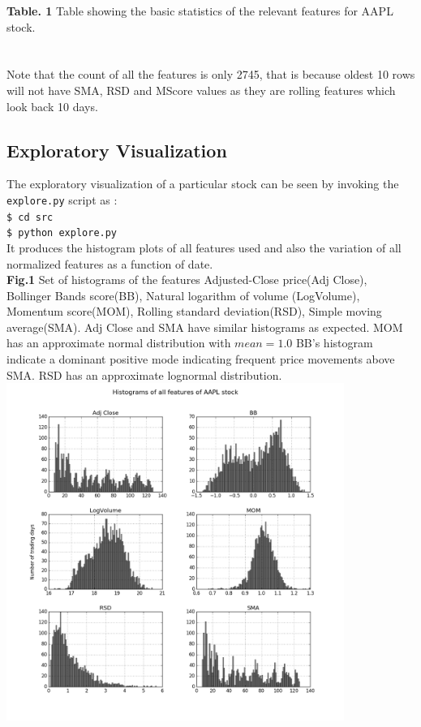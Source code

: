\documentclass[10pt]{report}
\begin{document}
\textbf{Table. 1} Table showing the basic statistics of the relevant features for AAPL stock.\\
\\
\\
Note that the count of all the features is only 2745, that is because oldest 10 rows will not have SMA, RSD and MScore values as they are rolling features which look back 10 days.\\
\subsection*{Exploratory Visualization}
The exploratory visualization of a particular stock can be seen by invoking the \texttt{explore.py} script as :\\
\texttt{\$ cd src\\
\$ python explore.py}\\
It produces the histogram plots of all features used and also the variation of all normalized features as a function of date.\\
\textbf{Fig.1} Set of histograms of the features Adjusted-Close price(Adj Close), Bollinger Bands score(BB), Natural logarithm of volume (LogVolume), Momentum score(MOM), Rolling standard deviation(RSD), Simple moving average(SMA). Adj Close and SMA have similar histograms as expected. MOM has an approximate normal distribution with $mean = 1.0$ BB's histogram indicate a dominant positive mode indicating frequent price movements above SMA. RSD has an approximate lognormal distribution.\\
\includegraphics[width=11cm]{plots/histograms.png}\\
\end{document}
